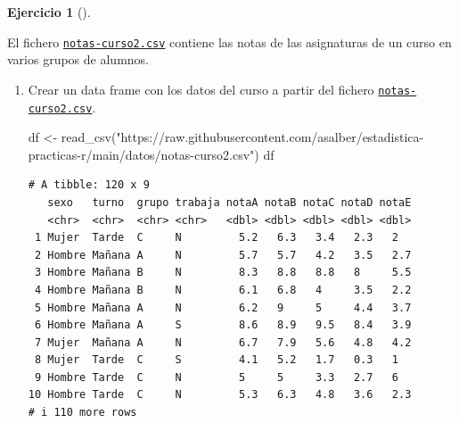 \documentclass[
  a4paper,
]{scrreport}
\newenvironment{Shaded}{\begin{snugshade}}{\end{snugshade}}
\newcommand{\FunctionTok}[1]{\textcolor[rgb]{0.28,0.35,0.67}{#1}}
\newcommand{\NormalTok}[1]{\textcolor[rgb]{0.00,0.23,0.31}{#1}}
\newcommand{\OtherTok}[1]{\textcolor[rgb]{0.00,0.23,0.31}{#1}}
\newcommand{\StringTok}[1]{\textcolor[rgb]{0.13,0.47,0.30}{#1}}
\theoremstyle{definition}
\newtheorem{exercise}{Ejercicio}[chapter]
\theoremstyle{remark}
\begin{document}
\begin{exercise}[]\protect\hypertarget{exr-preprocesamiento-3}{}\label{exr-preprocesamiento-3}

El fichero \href{datos/notas-curso2.csv}{\texttt{notas-curso2.csv}}
contiene las notas de las asignaturas de un curso en varios grupos de
alumnos.

\begin{enumerate}
\def\labelenumi{\alph{enumi}.}
\item
  Crear un data frame con los datos del curso a partir del fichero
  \href{datos/notas-curso2.csv}{\texttt{notas-curso2.csv}}.

  \begin{tcolorbox}[enhanced jigsaw, coltitle=black, left=2mm, colback=white, leftrule=.75mm, toptitle=1mm, breakable, bottomrule=.15mm, titlerule=0mm, bottomtitle=1mm, title=\textcolor{quarto-callout-tip-color}{\faLightbulb}\hspace{0.5em}{Solución}, arc=.35mm, toprule=.15mm, rightrule=.15mm, colframe=quarto-callout-tip-color-frame, opacityback=0, colbacktitle=quarto-callout-tip-color!10!white, opacitybacktitle=0.6]

\begin{Shaded}
\begin{Highlighting}[]
\NormalTok{df }\OtherTok{\textless{}{-}} \FunctionTok{read\_csv}\NormalTok{(}\StringTok{"https://raw.githubusercontent.com/asalber/estadistica{-}practicas{-}r/main/datos/notas{-}curso2.csv"}\NormalTok{)}
\NormalTok{df}
\end{Highlighting}
\end{Shaded}

\begin{verbatim}
# A tibble: 120 x 9
   sexo   turno  grupo trabaja notaA notaB notaC notaD notaE
   <chr>  <chr>  <chr> <chr>   <dbl> <dbl> <dbl> <dbl> <dbl>
 1 Mujer  Tarde  C     N         5.2   6.3   3.4   2.3   2  
 2 Hombre Mañana A     N         5.7   5.7   4.2   3.5   2.7
 3 Hombre Mañana B     N         8.3   8.8   8.8   8     5.5
 4 Hombre Mañana B     N         6.1   6.8   4     3.5   2.2
 5 Hombre Mañana A     N         6.2   9     5     4.4   3.7
 6 Hombre Mañana A     S         8.6   8.9   9.5   8.4   3.9
 7 Mujer  Mañana A     N         6.7   7.9   5.6   4.8   4.2
 8 Mujer  Tarde  C     S         4.1   5.2   1.7   0.3   1  
 9 Hombre Tarde  C     N         5     5     3.3   2.7   6  
10 Hombre Tarde  C     N         5.3   6.3   4.8   3.6   2.3
# i 110 more rows
\end{verbatim}


\end{tcolorbox}
\end{enumerate}
\end{exercise}
\end{document}
